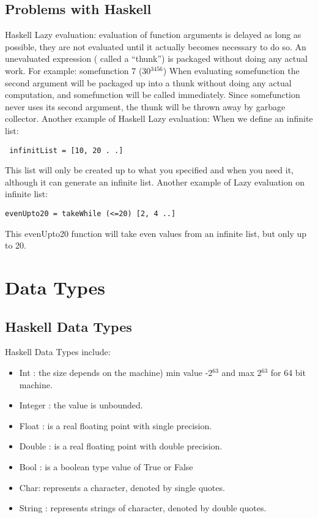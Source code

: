 \documentclass{article}
\begin{document}
\subsection{Problems with Haskell}
Haskell Lazy evaluation: evaluation of function arguments is delayed as long as possible, they are not evaluated until it actually becomes necessary to do so. An unevaluated expression ( called a “thunk”) is packaged without doing any actual work.
\newline \newline For example:
\newline  \newline \indent somefunction 7 (30$^3456$)
\newline \newline When evaluating somefunction the second argument will be packaged up into a thunk without doing any actual computation, and somefunction will be called immediately. Since somefunction never uses its second argument, the thunk will be thrown away by garbage collector.
\newline \newline Another example of Haskell Lazy evaluation:
\newline When we define an infinite list: 
\begin{lstlisting}
 infinitList = [10, 20 . .]
\end{lstlisting}
This list will only be created up to what you specified and when you need it, although it can generate an infinite list.
\newline Another example of Lazy evaluation on infinite list:
\begin{lstlisting}
evenUpto20 = takeWhile (<=20) [2, 4 ..]
\end{lstlisting}
This evenUpto20 function will take even values from an infinite list, but only up to 20.

\section{Data Types}
\subsection{Haskell Data Types}
Haskell Data Types include:
\begin{itemize}
  \item Int : the size depends on the machine) min value -2$^63$ and max 2$^63$ for 64 bit machine. 
  \item Integer : the value is unbounded.
  \item Float : is a real floating point with single precision.
  \item Double : is a real floating point with double precision.
  \item Bool : is a boolean type value of True or False
  \item Char: represents a character, denoted by  single quotes.
  \item String : represents strings of character, denoted by double quotes.
\end{itemize}
\end{document}
